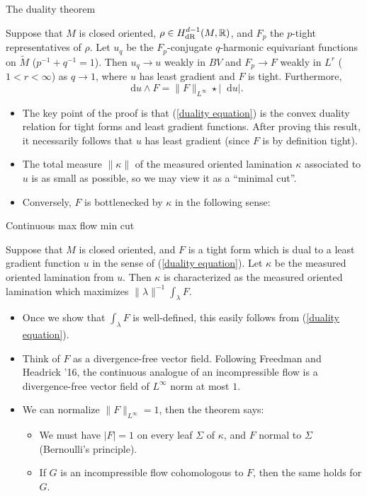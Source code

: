 \documentclass[10pt]{beamer}
\newcommand{\RR}{\mathbb{R}}
\newcommand*\dif{\mathop{}\!\mathrm{d}}
\begin{document}
\begin{frame}{The duality theorem}
\begin{theorem}[B, in preparation]
Suppose that $M$ is closed oriented, $\rho \in H^{d - 1}_{\rm dR}(M, \RR)$, and $F_p$ the $p$-tight representatives of $\rho$.
Let $u_q$ be the $F_p$-conjugate $q$-harmonic equivariant functions on $\tilde M$ ($p^{-1} + q^{-1} = 1$).
Then $u_q \to u$ weakly in $BV$ and $F_p \to F$ weakly in $L^r$ ($1 < r < \infty$) as $q \to 1$, where $u$ has least gradient and $F$ is tight. 
Furthermore, 
\begin{equation}\label{duality equation}
\dif u \wedge F = \|F\|_{L^\infty} \star |\dif u|.
\end{equation}
\end{theorem} \pause

\begin{itemize}
\item The key point of the proof is that (\ref{duality equation}) is the convex duality relation for tight forms and least gradient functions. After proving this result, it necessarily follows that $u$ has least gradient (since $F$ is by definition tight). \pause
\item The total measure $\|\kappa\|$ of the measured oriented lamination $\kappa$ associated to $u$ is as small as possible, so we may view it as a ``minimal cut''. \pause
\item Conversely, $F$ is bottlenecked by $\kappa$ in the following sense:
\end{itemize}
\end{frame}

\begin{frame}{Continuous max flow min cut}
\begin{theorem}[B, in preparation]
Suppose that $M$ is closed oriented, and $F$ is a tight form which is dual to a least gradient function $u$ in the sense of (\ref{duality equation}).
Let $\kappa$ be the measured oriented lamination from $u$.
Then $\kappa$ is characterized as the measured oriented lamination which maximizes $\|\lambda\|^{-1} \int_\lambda F$.
\end{theorem} \pause

\begin{itemize}
\item Once we show that $\int_\lambda F$ is well-defined, this easily follows from (\ref{duality equation}). \pause
\item Think of $F$ as a divergence-free vector field. Following Freedman and Headrick '16, the continuous analogue of an incompressible flow is a divergence-free vector field of $L^\infty$ norm at most $1$. \pause
\item We can normalize $\|F\|_{L^\infty} = 1$, then the theorem says: \pause
\begin{itemize}
\item We must have $|F| = 1$ on every leaf $\Sigma$ of $\kappa$, and $F$ normal to $\Sigma$ (Bernoulli's principle). \pause
\item If $G$ is an incompressible flow cohomologous to $F$, then the same holds for $G$.
\end{itemize}
\end{itemize}
\end{frame}
\end{document}
